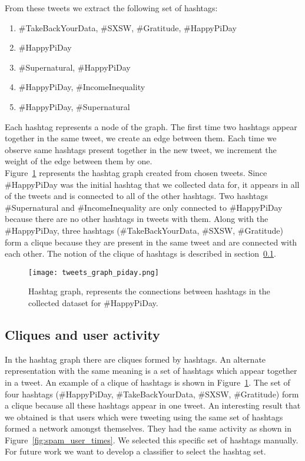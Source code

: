 \documentclass[journal, a4paper, 12pt]{article}
\begin{document}
From these tweets we extract the following set of hashtags:

\begin{enumerate}
\item \#TakeBackYourData, \#SXSW, \#Gratitude, \#HappyPiDay
\item \#HappyPiDay
\item \#Supernatural, \#HappyPiDay
\item \#HappyPiDay, \#IncomeInequality
\item \#HappyPiDay, \#Supernatural
\end{enumerate}


Each hashtag represents a node of the graph. The first time two hashtags appear together in the same tweet, we create an edge between them. Each time we observe same hashtags present together in the new tweet, we increment the weight of the edge between them by one.
\\

Figure~\ref{fig:tweets_graph_piday.png} represents the hashtag graph created from chosen tweets. Since \#HappyPiDay was the initial hashtag that we collected data for, it appears in all of the tweets and is connected to all of the other hashtags. Two hashtags \#Supernatural and \#IncomeInequality are only connected to \#HappyPiDay because there are no other hashtags in tweets with them. Along with the \#HappyPiDay, three hashtags (\#TakeBackYourData, \#SXSW, \#Gratitude) form a clique because they are present in the same tweet and are connected with each other. The notion of the clique of hashtags is described in section~\ref{cliques_subsection}.

    
        \begin{figure}[!hbt]
            \begin{center}
            \texttt{[image: tweets\_graph\_piday.png]}
            \caption{Hashtag graph, represents the connections between hashtags in the collected dataset for \#HappyPiDay.}
            \label{fig:tweets_graph_piday.png}
            \end{center}
      \end{figure}

\subsection{Cliques and user activity}\label{cliques_subsection}
In the hashtag graph there are cliques formed by hashtags. An alternate representation with the same meaning is a set of hashtags which appear together in a tweet. An example of a clique of hashtags is shown in Figure~\ref{fig:tweets_graph_piday.png}. The set of four hashtags (\#HappyPiDay, \#TakeBackYourData, \#SXSW, \#Gratitude) form a clique because all these hashtags appear in one tweet. An interesting result that we obtained is that users which were tweeting using the same set of hashtags formed a network amongst themselves. They had the same activity as shown in Figure~\ref{fig:spam_user_times}. We selected this specific set of hashtags manually. For future work we want to develop a classifier to select the hashtag set.
\\
\end{document}
